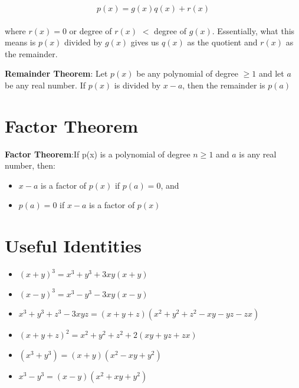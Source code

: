 \documentclass{book}
\begin{document}
	$$p(x) = g(x)q(x) + r(x)$$ \\
	
where $r(x) =0$ or degree of $r(x)$ $<$ degree of $g(x)$. Essentially, what this means is $p(x)$ divided by $g(x)$ gives us $q(x)$ as the quotient and $r(x)$ as the remainder.
	\begin{mdframed}[backgroundcolor=yellow]
		\textbf{Remainder Theorem}:  Let $p(x)$ be any polynomial of degree $\ge 1$ and let $a$ be any real number. If $p(x)$ is divided by $x-a$, then the remainder is $p(a)$
	\end{mdframed}	

	\section{Factor Theorem}
	\begin{mdframed}[backgroundcolor=yellow]
		\textbf{Factor Theorem}:If p(x) is a polynomial of degree $n \ge 1$ and $a$ is any real number, then:
		\begin{itemize}
			\item $x-a$ is a factor of $p(x)$ if $p(a)=0$, and
			\item $p(a)=0$ if $x-a$ is a factor of $p(x)$
		\end{itemize} 
	\end{mdframed}
	
	\section{Useful Identities}
	\begin{itemize}
		\item $(x+y)^3 = x^3 + y^3 + 3xy(x+y)$
		\item $(x-y)^3 = x^3 - y^3 -3xy(x-y)$
		\item $x^3 + y^3 + z^3 -3xyz = (x+y+z)(x^2 + y^2 + z^2 - xy -yz -zx)$
		\item $(x+y+z)^2 = x^2 + y^2 + z^2 + 2(xy + yz + zx)$
		\item $(x^3 + y^3)= (x+y)(x^2 -xy + y^2)$
		\item $x^3 - y^3 = (x-y)(x^2 + xy + y^2)$
	\end{itemize}
\end{document}
